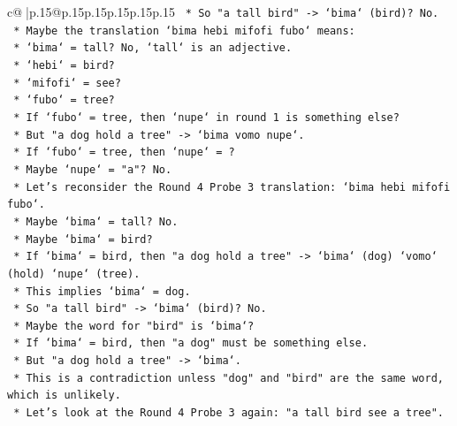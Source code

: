 \documentclass{article}
\begin{document}
{\begin{supertabular}{c@{$\;$}|p{.15\linewidth}@{}p{.15\linewidth}p{.15\linewidth}p{.15\linewidth}p{.15\linewidth}p{.15\linewidth}}
{{{\texttt{                            *   So "a tall bird" {-}> `bima` (bird)? No.} \\
\texttt{                            *   Maybe the translation `bima hebi mifofi fubo` means:} \\
\texttt{                                *   `bima` = tall? No, `tall` is an adjective.} \\
\texttt{                                *   `hebi` = bird?} \\
\texttt{                                *   `mifofi` = see?} \\
\texttt{                                *   `fubo` = tree?} \\
\texttt{                            *   If `fubo` = tree, then `nupe` in round 1 is something else?} \\
\texttt{                            *   But "a dog hold a tree" {-}> `bima vomo nupe`.} \\
\texttt{                            *   If `fubo` = tree, then `nupe` = ?} \\
\texttt{                            *   Maybe `nupe` = "a"? No.} \\
\texttt{                            *   Let's reconsider the Round 4 Probe 3 translation: `bima hebi mifofi fubo`.} \\
\texttt{                            *   Maybe `bima` = tall? No.} \\
\texttt{                            *   Maybe `bima` = bird?} \\
\texttt{                            *   If `bima` = bird, then "a dog hold a tree" {-}> `bima` (dog) `vomo` (hold) `nupe` (tree).} \\
\texttt{                            *   This implies `bima` = dog.} \\
\texttt{                            *   So "a tall bird" {-}> `bima` (bird)? No.} \\
\texttt{                            *   Maybe the word for "bird" is `bima`?} \\
\texttt{                            *   If `bima` = bird, then "a dog" must be something else.} \\
\texttt{                            *   But "a dog hold a tree" {-}> `bima`.} \\
\texttt{                            *   This is a contradiction unless "dog" and "bird" are the same word, which is unlikely.} \\
\texttt{                            *   Let's look at the Round 4 Probe 3 again: "a tall bird see a tree".} \\
}}}
\end{supertabular}}
\end{document}
